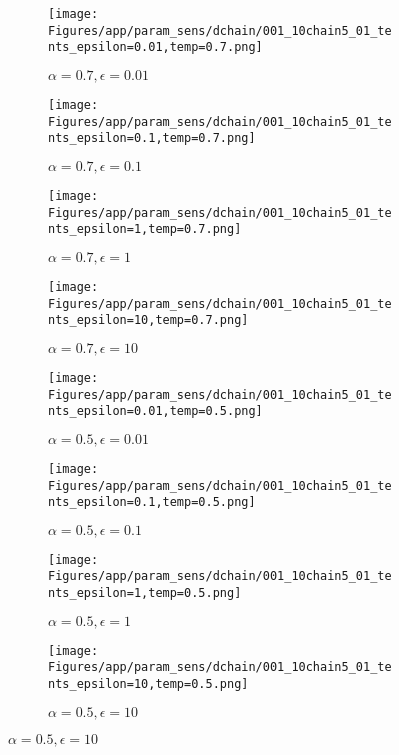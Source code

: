 \documentclass{article}
\theoremstyle{plain}
\begin{document}
\begin{appendices}
\begin{figure}
                \begin{subfigure}[b]{0.24\textwidth}
                    \centering
                    \texttt{[image: Figures/app/param\_sens/dchain/001\_10chain5\_01\_tents\_epsilon=0.01,temp=0.7.png]}
                    \caption*{$\alpha=0.7,\epsilon=0.01$}
                \end{subfigure}
                \begin{subfigure}[b]{0.24\textwidth}
                    \centering
                    \texttt{[image: Figures/app/param\_sens/dchain/001\_10chain5\_01\_tents\_epsilon=0.1,temp=0.7.png]}
                    \caption*{$\alpha=0.7,\epsilon=0.1$}
                \end{subfigure}
                \begin{subfigure}[b]{0.24\textwidth}
                    \centering
                    \texttt{[image: Figures/app/param\_sens/dchain/001\_10chain5\_01\_tents\_epsilon=1,temp=0.7.png]}
                    \caption*{$\alpha=0.7,\epsilon=1$}
                \end{subfigure}
                \begin{subfigure}[b]{0.24\textwidth}
                    \centering
                    \texttt{[image: Figures/app/param\_sens/dchain/001\_10chain5\_01\_tents\_epsilon=10,temp=0.7.png]}
                    \caption*{$\alpha=0.7,\epsilon=10$}
                \end{subfigure}
                
                \begin{subfigure}[b]{0.24\textwidth}
                    \centering
                    \texttt{[image: Figures/app/param\_sens/dchain/001\_10chain5\_01\_tents\_epsilon=0.01,temp=0.5.png]}
                    \caption*{$\alpha=0.5,\epsilon=0.01$}
                \end{subfigure}
                \begin{subfigure}[b]{0.24\textwidth}
                    \centering
                    \texttt{[image: Figures/app/param\_sens/dchain/001\_10chain5\_01\_tents\_epsilon=0.1,temp=0.5.png]}
                    \caption*{$\alpha=0.5,\epsilon=0.1$}
                \end{subfigure}
                \begin{subfigure}[b]{0.24\textwidth}
                    \centering
                    \texttt{[image: Figures/app/param\_sens/dchain/001\_10chain5\_01\_tents\_epsilon=1,temp=0.5.png]}
                    \caption*{$\alpha=0.5,\epsilon=1$}
                \end{subfigure}
                \begin{subfigure}[b]{0.24\textwidth}
                    \centering
                    \texttt{[image: Figures/app/param\_sens/dchain/001\_10chain5\_01\_tents\_epsilon=10,temp=0.5.png]}
                    \caption*{$\alpha=0.5,\epsilon=10$}
                \end{subfigure}
                

\end{figure}
\end{appendices}
\end{document}
